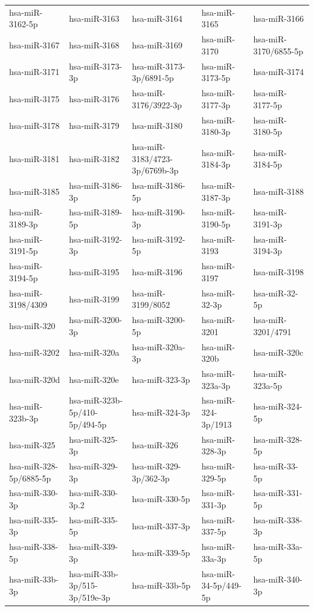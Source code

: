 \begin{longtable}{lllll}
hsa-miR-3162-5p & hsa-miR-3163 & hsa-miR-3164 & hsa-miR-3165 & hsa-miR-3166 \\
hsa-miR-3167 & hsa-miR-3168 & hsa-miR-3169 & hsa-miR-3170 & hsa-miR-3170/6855-5p \\
hsa-miR-3171 & hsa-miR-3173-3p & hsa-miR-3173-3p/6891-5p & hsa-miR-3173-5p & hsa-miR-3174 \\
hsa-miR-3175 & hsa-miR-3176 & hsa-miR-3176/3922-3p & hsa-miR-3177-3p & hsa-miR-3177-5p \\
hsa-miR-3178 & hsa-miR-3179 & hsa-miR-3180 & hsa-miR-3180-3p & hsa-miR-3180-5p \\
hsa-miR-3181 & hsa-miR-3182 & hsa-miR-3183/4723-3p/6769b-3p & hsa-miR-3184-3p & hsa-miR-3184-5p \\
hsa-miR-3185 & hsa-miR-3186-3p & hsa-miR-3186-5p & hsa-miR-3187-3p & hsa-miR-3188 \\
hsa-miR-3189-3p & hsa-miR-3189-5p & hsa-miR-3190-3p & hsa-miR-3190-5p & hsa-miR-3191-3p \\
hsa-miR-3191-5p & hsa-miR-3192-3p & hsa-miR-3192-5p & hsa-miR-3193 & hsa-miR-3194-3p \\
hsa-miR-3194-5p & hsa-miR-3195 & hsa-miR-3196 & hsa-miR-3197 & hsa-miR-3198 \\
hsa-miR-3198/4309 & hsa-miR-3199 & hsa-miR-3199/8052 & hsa-miR-32-3p & hsa-miR-32-5p \\
hsa-miR-320 & hsa-miR-3200-3p & hsa-miR-3200-5p & hsa-miR-3201 & hsa-miR-3201/4791 \\
hsa-miR-3202 & hsa-miR-320a & hsa-miR-320a-3p & hsa-miR-320b & hsa-miR-320c \\
hsa-miR-320d & hsa-miR-320e & hsa-miR-323-3p & hsa-miR-323a-3p & hsa-miR-323a-5p \\
hsa-miR-323b-3p & hsa-miR-323b-5p/410-5p/494-5p & hsa-miR-324-3p & hsa-miR-324-3p/1913 & hsa-miR-324-5p \\
hsa-miR-325 & hsa-miR-325-3p & hsa-miR-326 & hsa-miR-328-3p & hsa-miR-328-5p \\
hsa-miR-328-5p/6885-5p & hsa-miR-329-3p & hsa-miR-329-3p/362-3p & hsa-miR-329-5p & hsa-miR-33-5p \\
hsa-miR-330-3p & hsa-miR-330-3p.2 & hsa-miR-330-5p & hsa-miR-331-3p & hsa-miR-331-5p \\
hsa-miR-335-3p & hsa-miR-335-5p & hsa-miR-337-3p & hsa-miR-337-5p & hsa-miR-338-3p \\
hsa-miR-338-5p & hsa-miR-339-3p & hsa-miR-339-5p & hsa-miR-33a-3p & hsa-miR-33a-5p \\
hsa-miR-33b-3p & hsa-miR-33b-3p/515-3p/519e-3p & hsa-miR-33b-5p & hsa-miR-34-5p/449-5p & hsa-miR-340-3p \\

\end{longtable}
